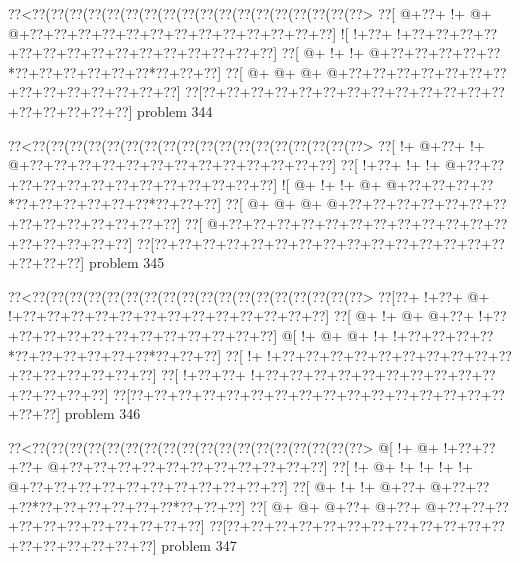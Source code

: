 \vbox{\vbox{\goo
\0??<\0??(\0??(\0??(\0??(\0??(\0??(\0??(\0??(\0??(\0??(\0??(\0??(\0??(\0??(\0??(\0??(\0??(\0??>
\0??[\- @+\0??+\- !+\- @+\- @+\0??+\0??+\0??+\0??+\0??+\0??+\0??+\0??+\0??+\0??+\0??+\0??+\0??]
\- ![\- !+\0??+\- !+\0??+\0??+\0??+\0??+\0??+\0??+\0??+\0??+\0??+\0??+\0??+\0??+\0??+\0??+\0??]
\0??[\- @+\- !+\- !+\- @+\0??+\0??+\0??+\0??+\0??*\0??+\0??+\0??+\0??+\0??+\0??*\0??+\0??+\0??]
\0??[\- @+\- @+\- @+\- @+\0??+\0??+\0??+\0??+\0??+\0??+\0??+\0??+\0??+\0??+\0??+\0??+\0??+\0??]
\0??[\0??+\0??+\0??+\0??+\0??+\0??+\0??+\0??+\0??+\0??+\0??+\0??+\0??+\0??+\0??+\0??+\0??+\0??]
}
\hfil problem 344\hfil\break
}



\vbox{\vbox{\goo
\0??<\0??(\0??(\0??(\0??(\0??(\0??(\0??(\0??(\0??(\0??(\0??(\0??(\0??(\0??(\0??(\0??(\0??(\0??>
\0??[\- !+\- @+\0??+\- !+\- @+\0??+\0??+\0??+\0??+\0??+\0??+\0??+\0??+\0??+\0??+\0??+\0??+\0??]
\0??[\- !+\0??+\- !+\- !+\- @+\0??+\0??+\0??+\0??+\0??+\0??+\0??+\0??+\0??+\0??+\0??+\0??+\0??]
\- ![\- @+\- !+\- !+\- @+\- @+\0??+\0??+\0??+\0??*\0??+\0??+\0??+\0??+\0??+\0??*\0??+\0??+\0??]
\0??[\- @+\- @+\- @+\- @+\0??+\0??+\0??+\0??+\0??+\0??+\0??+\0??+\0??+\0??+\0??+\0??+\0??+\0??]
\0??[\- @+\0??+\0??+\0??+\0??+\0??+\0??+\0??+\0??+\0??+\0??+\0??+\0??+\0??+\0??+\0??+\0??+\0??]
\0??[\0??+\0??+\0??+\0??+\0??+\0??+\0??+\0??+\0??+\0??+\0??+\0??+\0??+\0??+\0??+\0??+\0??+\0??]
}
\hfil problem 345\hfil\break
}



\vbox{\vbox{\goo
\0??<\0??(\0??(\0??(\0??(\0??(\0??(\0??(\0??(\0??(\0??(\0??(\0??(\0??(\0??(\0??(\0??(\0??(\0??>
\0??[\0??+\- !+\0??+\- @+\- !+\0??+\0??+\0??+\0??+\0??+\0??+\0??+\0??+\0??+\0??+\0??+\0??+\0??]
\0??[\- @+\- !+\- @+\- @+\0??+\- !+\0??+\0??+\0??+\0??+\0??+\0??+\0??+\0??+\0??+\0??+\0??+\0??]
\- @[\- !+\- @+\- @+\- !+\- !+\0??+\0??+\0??+\0??*\0??+\0??+\0??+\0??+\0??+\0??*\0??+\0??+\0??]
\0??[\- !+\- !+\0??+\0??+\0??+\0??+\0??+\0??+\0??+\0??+\0??+\0??+\0??+\0??+\0??+\0??+\0??+\0??]
\0??[\- !+\0??+\0??+\- !+\0??+\0??+\0??+\0??+\0??+\0??+\0??+\0??+\0??+\0??+\0??+\0??+\0??+\0??]
\0??[\0??+\0??+\0??+\0??+\0??+\0??+\0??+\0??+\0??+\0??+\0??+\0??+\0??+\0??+\0??+\0??+\0??+\0??]
}
\hfil problem 346\hfil\break
}



\vbox{\vbox{\goo
\0??<\0??(\0??(\0??(\0??(\0??(\0??(\0??(\0??(\0??(\0??(\0??(\0??(\0??(\0??(\0??(\0??(\0??(\0??>
\- @[\- !+\- @+\- !+\0??+\0??+\0??+\- @+\0??+\0??+\0??+\0??+\0??+\0??+\0??+\0??+\0??+\0??+\0??]
\0??[\- !+\- @+\- !+\- !+\- !+\- !+\- @+\0??+\0??+\0??+\0??+\0??+\0??+\0??+\0??+\0??+\0??+\0??]
\0??[\- @+\- !+\- !+\- @+\0??+\- @+\0??+\0??+\0??*\0??+\0??+\0??+\0??+\0??+\0??*\0??+\0??+\0??]
\0??[\- @+\- @+\- @+\0??+\- @+\0??+\- @+\0??+\0??+\0??+\0??+\0??+\0??+\0??+\0??+\0??+\0??+\0??]
\0??[\0??+\0??+\0??+\0??+\0??+\0??+\0??+\0??+\0??+\0??+\0??+\0??+\0??+\0??+\0??+\0??+\0??+\0??]
}
\hfil problem 347\hfil\break
}



